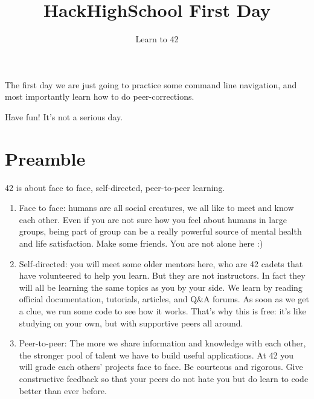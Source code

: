 \documentclass{42-en}
\begin{document}
\title{HackHighSchool First Day}
\subtitle{Learn to 42}


\summary
{
The first day we are just going to practice some command line navigation, and most importantly learn how to do peer-corrections.

Have fun! It's not a serious day.
}

\maketitle

\tableofcontents



\chapter{Preamble}

42 is about face to face, self-directed, peer-to-peer learning.

\begin{enumerate}

\item Face to face: humans are all social creatures, we all like to meet and know each other. Even if you are not sure how you feel about humans in large groups, being part of group can be a really powerful source of mental health and life satisfaction. Make some friends. You are not alone here :)

\item Self-directed: you will meet some older mentors here, who are 42 cadets that have volunteered to help you learn. But they are not instructors. In fact they will all be learning the same topics as you by your side. We learn by reading official documentation, tutorials, articles, and Q\&A forums. As soon as we get a clue, we run some code to see how it works. That's why this is free: it's like studying on your own, but with supportive peers all around.

\item Peer-to-peer: The more we share information and knowledge with each other, the stronger pool of talent we have to build useful applications. At 42 you will grade each others' projects face to face. Be courteous and rigorous. Give constructive feedback so that your peers do not hate you but do learn to code better than ever before.

\end{enumerate}
\end{document}
